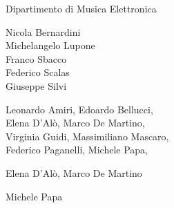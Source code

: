

%
%
	
{\fontsize{24}{22} }

\medskip

{\fontsize{12}{12} \textsf{Dipartimento di Musica Elettronica}}

\vspace{.5cm}

\textbf{}

Nicola Bernardini\\Michelangelo Lupone\\Franco Sbacco\\Federico Scalas\\Giuseppe Silvi

\medskip

\textbf{}

Leonardo Amiri, Edoardo Bellucci,\\Elena D’Alò, Marco De Martino, \\ Virginia Guidi, Massimiliano Mascaro,\\Federico Paganelli, Michele Papa, \\  

\medskip

%


\textbf{}

Elena D’Alò, Marco De Martino

\medskip

\textbf{}

Michele Papa

